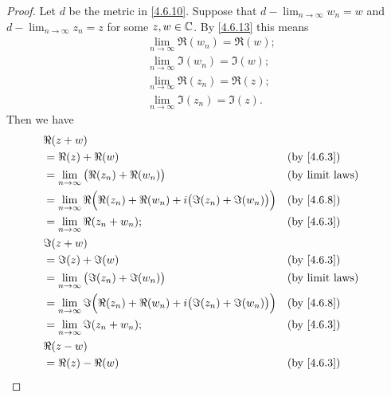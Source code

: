 \begin{proof}
  Let \(d\) be the metric in \cref{4.6.10}.
  Suppose that \(d - \lim_{n \to \infty} w_n = w\) and \(d - \lim_{n \to \infty} z_n = z\) for some \(z, w \in \mathbb{C}\).
  By \cref{4.6.13} this means
  \begin{align*}
     & \lim_{n \to \infty} \Re(w_n) = \Re(w); \\
     & \lim_{n \to \infty} \Im(w_n) = \Im(w); \\
     & \lim_{n \to \infty} \Re(z_n) = \Re(z); \\
     & \lim_{n \to \infty} \Im(z_n) = \Im(z).
  \end{align*}
  Then we have
  \begin{align*}
     & \Re(z + w)                                                                                                           \\
     & = \Re(z) + \Re(w)                                                                        &  & \by{4.6.3}             \\
     & = \lim_{n \to \infty} \big(\Re(z_n) + \Re(w_n)\big)                                      &  & \text{(by limit laws)} \\
     & = \lim_{n \to \infty} \Re\Big(\Re(z_n) + \Re(w_n) + i \big(\Im(z_n) + \Im(w_n)\big)\Big) &  & \by{4.6.8}             \\
     & = \lim_{n \to \infty} \Re(z_n + w_n);                                                    &  & \by{4.6.3}             \\
     & \Im(z + w)                                                                                                           \\
     & = \Im(z) + \Im(w)                                                                        &  & \by{4.6.3}             \\
     & = \lim_{n \to \infty} \big(\Im(z_n) + \Im(w_n)\big)                                      &  & \text{(by limit laws)} \\
     & = \lim_{n \to \infty} \Im\Big(\Re(z_n) + \Re(w_n) + i \big(\Im(z_n) + \Im(w_n)\big)\Big) &  & \by{4.6.8}             \\
     & = \lim_{n \to \infty} \Im(z_n + w_n);                                                    &  & \by{4.6.3}             \\
     & \Re(z - w)                                                                                                           \\
     & = \Re(z) - \Re(w)                                                                        &  & \by{4.6.3}             \\

\end{align*}
\end{proof}
